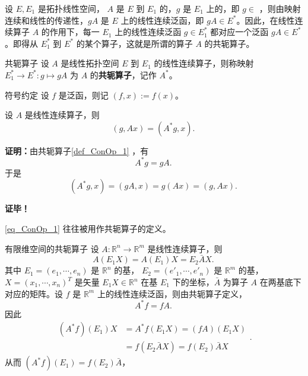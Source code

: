 

设 $E,E_1$ 是拓扑线性空间， $A$ 是 $E$ 到 $E_1$ 的，$g$ 是 $E_1$ 上的，即 $g\in$ ，则由映射连续和线性的传递性，$gA$ 是 $E$ 上的线性连续泛函，即 $gA\in E^*$。因此，在线性连续算子 $A$ 的作用下，每一 $E_1$ 上的线性连续泛函 $g\in E_1^*$ 都对应一个泛函 $gA\in E^*$。即得从 $E_1^*$ 到 $E^*$ 的某个算子，这就是所谓的算子 $A$ 的共轭算子。

\begin{definition}{共轭算子}\label{def_ConOp_1}
设 $A$ 是线性拓扑空间 $E$ 到 $E_1$ 的线性连续算子，则称映射 $E_1^*\rightarrow  E^*:g\mapsto gA$ 为 $A$ 的\textbf{共轭算子}，记作 $A^*$。
\end{definition}

\begin{definition}{符号约定}
设 $f$ 是泛函，则记 $(f,x):=f(x)$。
\end{definition}

\begin{theorem}{}
设 $A$ 是线性连续算子，则
\begin{equation}\label{eq_ConOp_1}
(g,Ax)=(A^* g,x).~
\end{equation}
\end{theorem}

\textbf{证明：}由共轭算子\autoref{def_ConOp_1} ，有
\begin{equation}
A^*g=gA.~
\end{equation}
于是 
\begin{equation}
(A^*g,x)=(gA,x)=g(Ax)=(g,Ax).~
\end{equation}

\textbf{证毕！}
 
 
\autoref{eq_ConOp_1} 往往被用作共轭算子的定义。


\begin{example}{有限维空间的共轭算子}
设 $A:\mathbb R^n\rightarrow\mathbb R^m$ 是线性连续算子，则 
\begin{equation}
A(E_1 X)=A(E_1)X=E_2 \bar AX.~
\end{equation}
其中 $E_1=(e_1,\cdots,e_n)$ 是 $\mathbb R^n$ 的基， $E_2=(e'_1,\cdots,e'_n)$ 是 $\mathbb R^m$ 的基，$X=(x_1,\cdots,x_n)^T$ 是矢量 $E_1X\in\mathbb R^n$ 在基 $E_1$ 下的坐标，$\bar A$ 为算子 $A$ 在两基底下对应的矩阵。设 $f$ 是 $\mathbb R^m$ 上的线性连续泛函，则由共轭算子定义，
\begin{equation}
A^*f=fA.~
\end{equation}
因此
\begin{equation}
\begin{aligned}
(A^*f)(E_1)X&=A^*f(E_1X)=(fA)(E_1X)\\
&=f(E_2 \bar AX)=f(E_2)\bar AX
\end{aligned}.~
\end{equation}
从而 $(A^*f)(E_1)=f(E_2)\bar A$，
\end{example}


